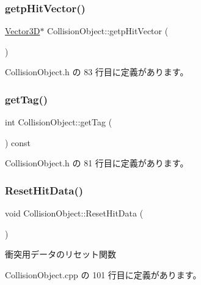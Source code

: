 \subsubsection{\texorpdfstring{getp\+Hit\+Vector()}{getpHitVector()}}
{\footnotesize\ttfamily \mbox{\hyperlink{class_vector3_d}{Vector3D}}$\ast$ Collision\+Object\+::getp\+Hit\+Vector (\begin{DoxyParamCaption}{ }\end{DoxyParamCaption})\hspace{0.3cm}{\ttfamily [inline]}}



 Collision\+Object.\+h の 83 行目に定義があります。

\mbox{\label{class_collision_object_a1198d5941d2ba8a9b394c0e43e4b9fd9}} 
\subsubsection{\texorpdfstring{get\+Tag()}{getTag()}}
{\footnotesize\ttfamily int Collision\+Object\+::get\+Tag (\begin{DoxyParamCaption}{ }\end{DoxyParamCaption}) const\hspace{0.3cm}{\ttfamily [inline]}}



 Collision\+Object.\+h の 81 行目に定義があります。

\mbox{\label{class_collision_object_a92dd5d21c6674605d290e0d37d64505a}} 
\subsubsection{\texorpdfstring{Reset\+Hit\+Data()}{ResetHitData()}}
{\footnotesize\ttfamily void Collision\+Object\+::\+Reset\+Hit\+Data (\begin{DoxyParamCaption}{ }\end{DoxyParamCaption})}



衝突用データのリセット関数 



 Collision\+Object.\+cpp の 101 行目に定義があります。

